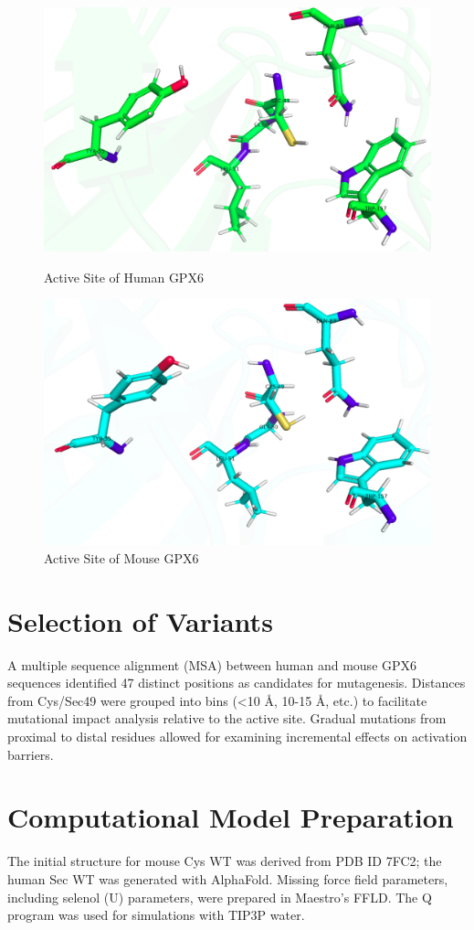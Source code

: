 \documentclass[journal=jacsat,manuscript=article]{achemso}
\begin{document}
\begin{figure}
\includegraphics[width=0.7\linewidth]{figures/activesite_humansec.png} 
\caption{Active Site of Human GPX6}
\label{fig:figure4}
\includegraphics[width=0.7\linewidth]{figures/activesite_mousecys.png} 
\caption{Active Site of Mouse GPX6}
\label{fig:figure5}
\end{figure}

\section{Selection of Variants}

A multiple sequence alignment (MSA) between human and mouse GPX6 sequences identified 47 distinct positions as candidates for mutagenesis. Distances from Cys/Sec49 were grouped into bins (<10 Å, 10-15 Å, etc.) to facilitate mutational impact analysis relative to the active site. Gradual mutations from proximal to distal residues allowed for examining incremental effects on activation barriers.

\section{Computational Model Preparation}

The initial structure for mouse Cys WT was derived from PDB ID 7FC2; the human Sec WT was generated with AlphaFold. Missing force field parameters, including selenol (U) parameters, were prepared in Maestro’s FFLD. The Q program was used for simulations with TIP3P water.
\end{document}
